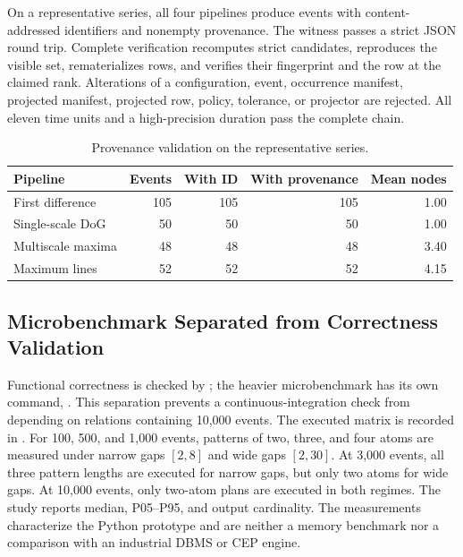 On a representative series, all four pipelines produce events with content-addressed identifiers and nonempty provenance. The witness passes a strict JSON round trip. Complete verification recomputes strict candidates, reproduces the visible set, rematerializes  rows, and verifies their fingerprint and the row at the claimed rank. Alterations of a configuration, event, occurrence manifest, projected manifest, projected row, policy, tolerance, or projector are rejected. All eleven time units and a high-precision duration pass the complete chain.

\begin{table}[H]
\centering
\caption{Provenance validation on the representative series.}
\label{tab:provenance-validation}
\small
\begin{tabular}{lrrrr}
\toprule
Pipeline & Events & With ID & With provenance & Mean nodes \\
\midrule
First difference & 105 & 105 & 105 & 1.00 \\
Single-scale DoG & 50 & 50 & 50 & 1.00 \\
Multiscale maxima & 48 & 48 & 48 & 3.40 \\
Maximum lines & 52 & 52 & 52 & 4.15 \\
\bottomrule
\end{tabular}
\end{table}

\subsection{Microbenchmark Separated from Correctness Validation}

Functional correctness is checked by ; the heavier microbenchmark has its own command, . This separation prevents a continuous-integration check from depending on relations containing 10,000 events. The executed matrix is recorded in . For 100, 500, and 1,000 events, patterns of two, three, and four atoms are measured under narrow gaps $[2,8]$ and wide gaps $[2,30]$. At 3,000 events, all three pattern lengths are executed for narrow gaps, but only two atoms for wide gaps. At 10,000 events, only two-atom plans are executed in both regimes. The study reports median, P05--P95, and output cardinality. The measurements characterize the Python prototype and are neither a memory benchmark nor a comparison with an industrial DBMS or CEP engine.

